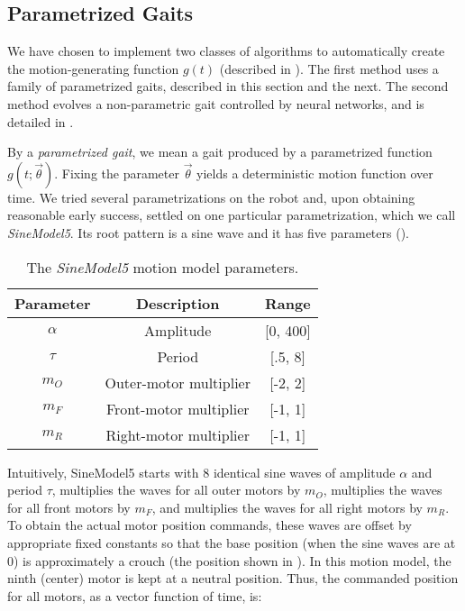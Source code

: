 \subsection{Parametrized Gaits}

We have chosen to implement two classes of algorithms to automatically create the motion-generating function $g(t)$ (described in
).  The first method uses a family of
parametrized gaits, described in this section and the next. The
second method evolves a non-parametric gait controlled by neural networks, and is detailed in
.

By a \emph{parametrized gait}, we mean a gait produced by a
parametrized function $g(t; \vec{\theta})$. Fixing the parameter
$\vec{\theta}$ yields a deterministic motion function over time.  We
tried several parametrizations on the robot and, upon obtaining
reasonable early success, settled on one particular parametrization, which we call  \emph{SineModel5}. Its root pattern is a sine wave and it has five parameters ().

\newcommand{\amp}{\ensuremath{\alpha}}

\begin{table}[h!]
\begin{center}
\begin{tabular}{|c|c|c|}
\hline
Parameter    & Description               & Range \\
\hline
\hline
\amp         & Amplitude                 & [0, 400] \\
\hline
$\tau$       & Period                    & [.5, 8] \\
\hline
$m_O$        & Outer-motor multiplier    & [-2, 2] \\
\hline
$m_F$        & Front-motor multiplier    & [-1, 1] \\
\hline
$m_R$        & Right-motor multiplier    & [-1, 1] \\
\hline
\end{tabular}
\caption{The \emph{SineModel5} motion model parameters.}
\label{tab:params}
\end{center}
\end{table}

Intuitively, SineModel5 starts with 8 identical sine waves of
amplitude $\amp$ and period $\tau$, multiplies the waves for all outer
motors by $m_O$, multiplies the waves for all front motors by $m_F$,
and multiplies the waves for all right motors by $m_R$.  To obtain the
actual motor position commands, these waves are offset by
appropriate fixed constants so that the base position (when the sine
waves are at 0) is approximately a crouch (the position shown in
).  In this motion model, the ninth
(center) motor is kept at a neutral position.  Thus, the commanded
position for all motors, as a vector function of time, is:

